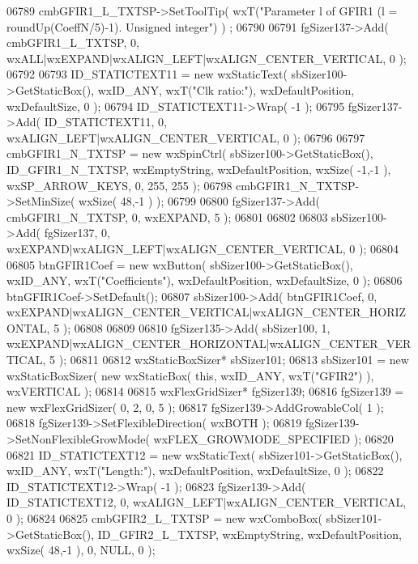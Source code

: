 \begin{DoxyCode}
06789     cmbGFIR1_L_TXTSP->SetToolTip( wxT(\textcolor{stringliteral}{"Parameter l of GFIR1 (l = roundUp(CoeffN/5)-1). Unsigned integer"}) )
      ;
06790     
06791     fgSizer137->Add( cmbGFIR1_L_TXTSP, 0, wxALL|wxEXPAND|wxALIGN\_LEFT|wxALIGN\_CENTER\_VERTICAL, 0 );
06792     
06793     ID_STATICTEXT11 = \textcolor{keyword}{new} wxStaticText( sbSizer100->GetStaticBox(), wxID\_ANY, wxT(\textcolor{stringliteral}{"Clk ratio:"}), 
      wxDefaultPosition, wxDefaultSize, 0 );
06794     ID_STATICTEXT11->Wrap( -1 );
06795     fgSizer137->Add( ID_STATICTEXT11, 0, wxALIGN\_LEFT|wxALIGN\_CENTER\_VERTICAL, 0 );
06796     
06797     cmbGFIR1_N_TXTSP = \textcolor{keyword}{new} wxSpinCtrl( sbSizer100->GetStaticBox(), 
      ID_GFIR1_N_TXTSP, wxEmptyString, wxDefaultPosition, wxSize( -1,-1 ), wxSP\_ARROW\_KEYS, 0, 255, 255 );
06798     cmbGFIR1_N_TXTSP->SetMinSize( wxSize( 48,-1 ) );
06799     
06800     fgSizer137->Add( cmbGFIR1_N_TXTSP, 0, wxEXPAND, 5 );
06801     
06802     
06803     sbSizer100->Add( fgSizer137, 0, wxEXPAND|wxALIGN\_LEFT|wxALIGN\_CENTER\_VERTICAL, 0 );
06804     
06805     btnGFIR1Coef = \textcolor{keyword}{new} wxButton( sbSizer100->GetStaticBox(), wxID\_ANY, wxT(\textcolor{stringliteral}{"Coefficients"}), 
      wxDefaultPosition, wxDefaultSize, 0 );
06806     btnGFIR1Coef->SetDefault(); 
06807     sbSizer100->Add( btnGFIR1Coef, 0, wxEXPAND|wxALIGN\_CENTER\_VERTICAL|wxALIGN\_CENTER\_HORIZONTAL, 5 );
06808     
06809     
06810     fgSizer135->Add( sbSizer100, 1, wxEXPAND|wxALIGN\_CENTER\_HORIZONTAL|wxALIGN\_CENTER\_VERTICAL, 5 );
06811     
06812     wxStaticBoxSizer* sbSizer101;
06813     sbSizer101 = \textcolor{keyword}{new} wxStaticBoxSizer( \textcolor{keyword}{new} wxStaticBox( \textcolor{keyword}{this}, wxID\_ANY, wxT(\textcolor{stringliteral}{"GFIR2"}) ), wxVERTICAL );
06814     
06815     wxFlexGridSizer* fgSizer139;
06816     fgSizer139 = \textcolor{keyword}{new} wxFlexGridSizer( 0, 2, 0, 5 );
06817     fgSizer139->AddGrowableCol( 1 );
06818     fgSizer139->SetFlexibleDirection( wxBOTH );
06819     fgSizer139->SetNonFlexibleGrowMode( wxFLEX\_GROWMODE\_SPECIFIED );
06820     
06821     ID_STATICTEXT12 = \textcolor{keyword}{new} wxStaticText( sbSizer101->GetStaticBox(), wxID\_ANY, wxT(\textcolor{stringliteral}{"Length:"}), 
      wxDefaultPosition, wxDefaultSize, 0 );
06822     ID_STATICTEXT12->Wrap( -1 );
06823     fgSizer139->Add( ID_STATICTEXT12, 0, wxALIGN\_LEFT|wxALIGN\_CENTER\_VERTICAL, 0 );
06824     
06825     cmbGFIR2_L_TXTSP = \textcolor{keyword}{new} wxComboBox( sbSizer101->GetStaticBox(), 
      ID_GFIR2_L_TXTSP, wxEmptyString, wxDefaultPosition, wxSize( 48,-1 ), 0, NULL, 0 ); 

\end{DoxyCode}
